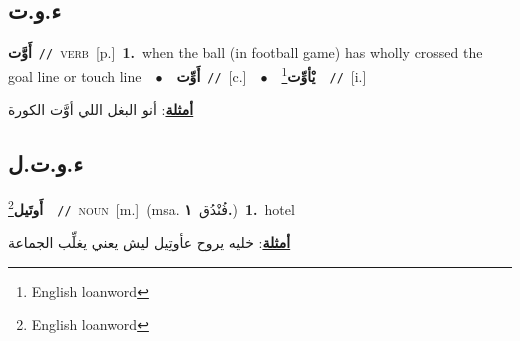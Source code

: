 \documentclass[10pt,a4paper,twoside]{article} %
\begin{document}
\begin{multicols}{2}
\vspace{-3mm}
\subsection*{\color{blue}\foreignlanguage{arabic}{ء.و.ت}\color{blue}{ (ntws)}} 

{\setlength\topsep{0pt}\textbf{\foreignlanguage{arabic}{أَوَّت}}\ {\color{gray}\texttt{//}\color{black}}\ \textsc{verb}\ [p.]\ \textbf{1.}~when the ball (in football game) has wholly crossed the goal line or touch line\ \ $\bullet$\ \ \setlength\topsep{0pt}\textbf{\foreignlanguage{arabic}{أَوِّت}}\ {\color{gray}\texttt{//}\color{black}}\ [c.]\ \ $\bullet$\ \ \setlength\topsep{0pt}\textbf{\foreignlanguage{arabic}{يْأوِّت}}\footnote{English loanword}\ \ {\color{gray}\texttt{//}\color{black}}\ [i.]\  \begin{flushright}\color{gray}\foreignlanguage{arabic}{\textbf{\underline{\foreignlanguage{arabic}{أمثلة}}}: أنو البغل اللي أوَّت الكورة}\end{flushright}\color{black}} \vspace{2mm}

\vspace{-3mm}
\subsection*{\color{blue}\foreignlanguage{arabic}{ء.و.ت.ل}\color{blue}{ (ntws)}} 

{\setlength\topsep{0pt}\textbf{\foreignlanguage{arabic}{أَوتَيل}}\footnote{English loanword}\ \ {\color{gray}\texttt{//}\color{black}}\ \textsc{noun}\ [m.]\ \color{gray}(msa. \foreignlanguage{arabic}{فُنْدُق}~\foreignlanguage{arabic}{\textbf{١.}})\color{black}\ \textbf{1.}~hotel\  \begin{flushright}\color{gray}\foreignlanguage{arabic}{\textbf{\underline{\foreignlanguage{arabic}{أمثلة}}}: خليه يروح عأوتِيل ليش يعني يغلِّب الجماعة}\end{flushright}\color{black}} \vspace{2mm}


\end{multicols}
\end{document}
